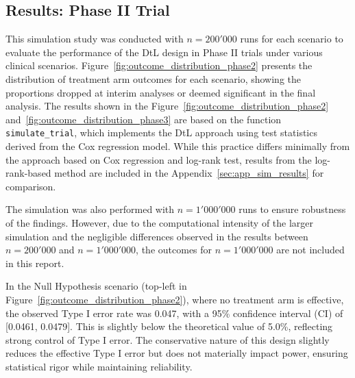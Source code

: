 \documentclass[11pt, a4paper]{article}\usepackage[]{graphicx}\usepackage[]{xcolor}
\begin{document}
%
%
%


\subsection{Results: Phase II Trial} \label{sec:simulation_results}
This simulation study was conducted with $n = 200'000$ runs for each scenario to evaluate the performance of the DtL design in Phase II trials under various clinical scenarios. Figure~\ref{fig:outcome_distribution_phase2} presents the distribution of treatment arm outcomes for each scenario, showing the proportions dropped at interim analyses or deemed significant in the final analysis. The results shown in the Figure~\ref{fig:outcome_distribution_phase2} and~\ref{fig:outcome_distribution_phase3} are based on the function \texttt{simulate\_trial}, which implements the DtL approach using test statistics derived from the Cox regression model. While this practice differs minimally from the approach based on Cox regression and log-rank test, results from the log-rank-based method are included in the Appendix~\ref{sec:app_sim_results} for comparison.

The simulation was also performed with $n = 1'000'000$ runs to ensure robustness of the findings. However, due to the computational intensity of the larger simulation and the negligible differences observed in the results between $n = 200'000$ and $n = 1'000'000$, the outcomes for $n = 1'000'000$ are not included in this report.

In the Null Hypothesis scenario (top-left in Figure~\ref{fig:outcome_distribution_phase2}), where no treatment arm is effective, the observed Type I error rate was 0.047, with a 95\% confidence interval (CI) of [0.0461, 0.0479]. This is slightly below the theoretical value of 5.0\%, reflecting strong control of Type I error. The conservative nature of this design slightly reduces the effective Type I error but does not materially impact power, ensuring statistical rigor while maintaining reliability.
\end{document}
